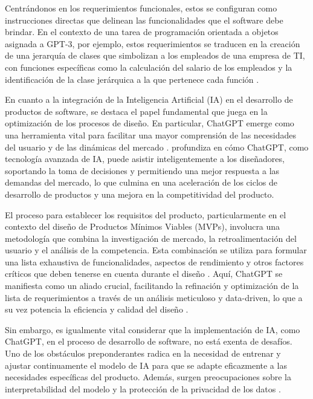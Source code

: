 Centrándonos en los requerimientos funcionales, estos se configuran como instrucciones directas que delinean las funcionalidades que el software debe brindar. En el contexto de una tarea de programación orientada a objetos asignada a GPT-3, por ejemplo, estos requerimientos se traducen en la creación de una jerarquía de clases que simbolizan a los empleados de una empresa de TI, con funciones específicas como la calculación del salario de los empleados y la identificación de la clase jerárquica a la que pertenece cada función \citep{Cipriano2023GPT-3Report}.

En cuanto a la integración de la Inteligencia Artificial (IA) en el desarrollo de productos de software, se destaca el papel fundamental que juega en la optimización de los procesos de diseño. En particular, ChatGPT emerge como una herramienta vital para facilitar una mayor comprensión de las necesidades del usuario y de las dinámicas del mercado \citep{Wu2023AgileDesign}. \citet{Wu2023AgileDesign} profundiza en cómo ChatGPT, como tecnología avanzada de IA, puede asistir inteligentemente a los diseñadores, soportando la toma de decisiones y permitiendo una mejor respuesta a las demandas del mercado, lo que culmina en una aceleración de los ciclos de desarrollo de productos y una mejora en la competitividad del producto.

El proceso para establecer los requisitos del producto, particularmente en el contexto del diseño de Productos Mínimos Viables (MVPs), involucra una metodología que combina la investigación de mercado, la retroalimentación del usuario y el análisis de la competencia. Esta combinación se utiliza para formular una lista exhaustiva de funcionalidades, aspectos de rendimiento y otros factores críticos que deben tenerse en cuenta durante el diseño \citep{Wu2023AgileDesign}. Aquí, ChatGPT se manifiesta como un aliado crucial, facilitando la refinación y optimización de la lista de requerimientos a través de un análisis meticuloso y data-driven, lo que a su vez potencia la eficiencia y calidad del diseño \citep{Wu2023AgileDesign}.

Sin embargo, es igualmente vital considerar que la implementación de IA, como ChatGPT, en el proceso de desarrollo de software, no está exenta de desafíos. Uno de los obstáculos preponderantes radica en la necesidad de entrenar y ajustar continuamente el modelo de IA para que se adapte eficazmente a las necesidades específicas del producto. Además, surgen preocupaciones sobre la interpretabilidad del modelo y la protección de la privacidad de los datos \citep{Wu2023AgileDesign}.

